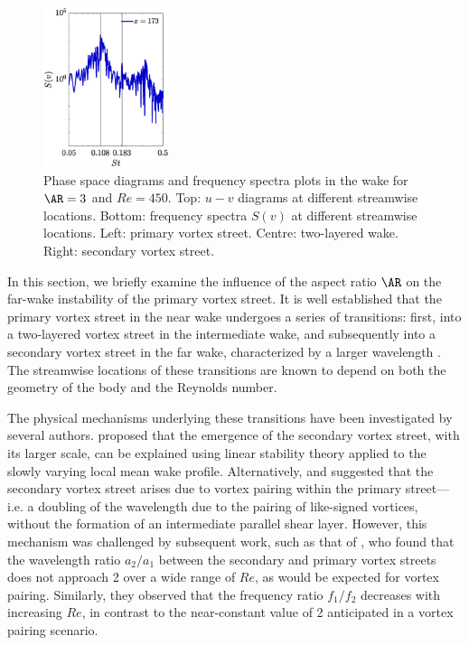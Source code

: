 \begin{figure}
\includegraphics[width=0.328\textwidth]{./fig/appendix/Spec_AR3_Re450_c.eps}
\caption{Phase space diagrams and frequency spectra plots in the wake for $\AR=3$ and $Re=450$. Top: $u-v$ diagrams at different streamwise locations. Bottom: frequency spectra $S(v)$ at different streamwise locations. Left: primary vortex street. Centre: two-layered wake. Right: secondary vortex street.}
\label{fig:wake_AR3}
\end{figure}

In this section, we briefly examine the influence of the aspect ratio $\AR$ on the far-wake instability of the primary vortex street. It is well established that the primary vortex street in the near wake undergoes a series of transitions: first, into a two-layered vortex street in the intermediate wake, and subsequently into a secondary vortex street in the far wake, characterized by a larger wavelength \citep{vorobieff-goergiev-ingber-2002,kumar-mittal-2012}. The streamwise locations of these transitions are known to depend on both the geometry of the body and the Reynolds number.

The physical mechanisms underlying these transitions have been investigated by several authors. \citet{taneda-1959} proposed that the emergence of the secondary vortex street, with its larger scale, can be explained using linear stability theory applied to the slowly varying local mean wake profile. Alternatively, \citet{matsui-okude-1982} and \citet{okude-matsui-1990} suggested that the secondary vortex street arises due to vortex pairing within the primary street—i.e. a doubling of the wavelength due to the pairing of like-signed vortices, without the formation of an intermediate parallel shear layer. However, this mechanism was challenged by subsequent work, such as that of \citet{karasudani-funakoshi-1994}, who found that the wavelength ratio $a_2/a_1$ between the secondary and primary vortex streets does not approach 2 over a wide range of $Re$, as would be expected for vortex pairing. Similarly, they observed that the frequency ratio $f_1/f_2$ decreases with increasing $Re$, in contrast to the near-constant value of 2 anticipated in a vortex pairing scenario.

